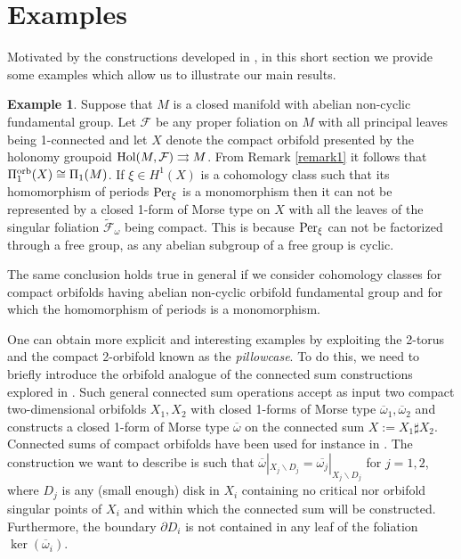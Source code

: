 \documentclass[
  a4paper, 
  reqno, 
  oneside, 
  12pt
]{amsart}
\theoremstyle{definition}
\newtheorem{example}[theorem]{Example}
\theoremstyle{remark}
\newcommand{\rr}{\rightrightarrows}
\begin{document}
\section{Examples}\label{sec:5}

Motivated by the constructions developed in \cite{FKL}, in this short section we provide some examples which allow us to illustrate our main results.

\begin{example}
	Suppose that $M$ is a closed manifold with abelian non-cyclic fundamental group. Let $\mathcal{F}$ be any proper foliation on $M$ with all principal leaves being 1-connected and let $X$ denote the compact orbifold presented by the holonomy groupoid $\textnormal{Hol}(M,\mathcal{F})\rr M$. From Remark \ref{remark1} it follows that $\Pi_1^{\textnormal{orb}}(X)\cong \Pi_1(M)$. If $\xi\in H^1(X)$ is a cohomology class such that its homomorphism of periods $\textnormal{Per}_\xi$ is a monomorphism then it can not be represented by a closed 1-form of Morse type on $X$ with all the leaves of the singular foliation $\tilde{\mathcal{F}}_\omega$ being compact. This is because $\textnormal{Per}_\xi$ can not be factorized through a free group, as any abelian subgroup of a free group is cyclic. 
	
	The same conclusion holds true in general if we consider cohomology classes for compact orbifolds having abelian non-cyclic orbifold fundamental group and for which the homomorphism of periods is a monomorphism.
\end{example}

One can obtain more explicit and interesting examples by exploiting the 2-torus and the compact 2-orbifold known as the \emph{pillowcase}. To do this, we need to briefly introduce the orbifold analogue of the connected sum constructions explored in \cite{FKL}. Such general connected sum operations accept as input two compact two-dimensional orbifolds $X_1, X_2$ with closed 1-forms of Morse type $\overline{\omega}_1, \overline{\omega}_2$ and constructs a closed 1-form of Morse type $\overline{\omega}$ on the connected sum $X:=X_1\sharp X_2$. Connected sums of compact orbifolds have been used for instance in \cite{FarProSea,KleinerLott}. The construction we want to describe is such that $\overline{\omega}|_{X_j\backslash D_j}=\overline{\omega_j}|_{X_j\backslash D_j}$ for $j=1,2$, where $D_j$ is any (small enough) disk in $X_i$ containing no critical nor orbifold singular points of $X_i$ and within which the connected sum will be constructed. Furthermore, the boundary $\partial D_i$ is not contained in any leaf of the foliation $\ker(\overline{\omega}_i)$.
\end{document}

